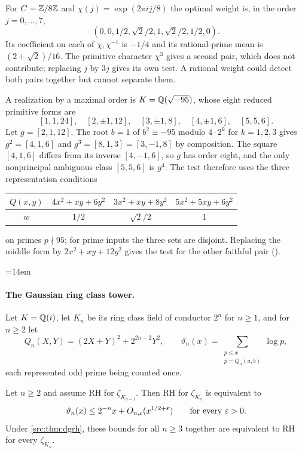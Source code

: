 \begin{example}\label{hec:ex:d95}
For $C=\mathbb{Z}/8\mathbb{Z}$ and $\chi(j)=\exp(2\pi ij/8)$ the optimal weight is, in the order $j=0,\dots,7$,
\[
 (0,0,1/2,\sqrt2/2,1,\sqrt2/2,1/2,0).
\]
Its coefficient on each of $\chi,\chi^{-1}$ is $-1/4$ and its rational-prime mean is $(2+\sqrt2)/16$. The
primitive character $\chi^3$ gives a second pair, which does not contribute; replacing $j$ by $3j$ gives
its own test. A rational weight could detect both pairs together but cannot separate them.

A realization by a maximal order is $K=\mathbb{Q}(\sqrt{-95})$, whose eight reduced primitive forms are
\[
 [1,1,24],\quad[2,\pm1,12],\quad[3,\pm1,8],\quad[4,\pm1,6],\quad[5,5,6].
\]
Let $g=[2,1,12]$. The root $b=1$ of $b^2\equiv-95$ modulo $4\cdot2^k$ for $k=1,2,3$ gives $g^2=[4,1,6]$ and
$g^3=[8,1,3]=[3,-1,8]$ by composition. The square $[4,1,6]$ differs from its inverse $[4,-1,6]$, so $g$ has
order eight, and the only nonprincipal ambiguous class $[5,5,6]$ is $g^4$. The test therefore uses the
three representation conditions
\begin{center}
\begin{tabular}{c|ccc}
$Q(x,y)$ & $4x^2+xy+6y^2$ & $3x^2+xy+8y^2$ & $5x^2+5xy+6y^2$\\\hline
$w$ & $1/2$ & $\sqrt2/2$ & $1$
\end{tabular}
\end{center}
on primes $p\nmid95$; for prime inputs the three sets are disjoint. Replacing the middle form by
$2x^2+xy+12y^2$ gives the test for the other faithful pair
().
{\emergencystretch=14em\par}
\end{example}

\paragraph{The Gaussian ring class tower.}
Let $K=\mathbb{Q}(i)$, let $K_n$ be its ring class field of conductor $2^n$ for $n\ge1$, and for $n\ge2$ let
\[
 Q_n(X,Y)=(2X+Y)^2+2^{2n-2}Y^2,\qquad
 \vartheta_n(x)=\sum_{\substack{p\le x\\ p=Q_n(a,b)}}\log p,
\]
each represented odd prime being counted once.

\begin{theorem}\label{hec:thm:tower}
Let $n\ge2$ and assume RH for $\zeta_{K_{n-1}}$. Then RH for $\zeta_{K_n}$ is equivalent to
\[
 \vartheta_n(x)\le2^{-n}x+O_{n,\varepsilon}(x^{1/2+\varepsilon})\qquad\text{for every }\varepsilon>0 .
\]
Under \cref{src:thm:dgrh}, these bounds for all $n\ge3$ together are equivalent to RH for every
$\zeta_{K_n}$.
\end{theorem}

